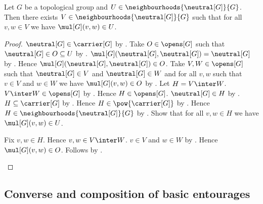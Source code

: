 \begin{theorem}\label{topological_group_identity_neighbourhood_product_refinement}
    Let $G$ be a topological group and
        $U\in\neighbourhoods{\neutral[G]}{G}$.
    Then there exists $V\in\neighbourhoods{\neutral[G]}{G}$ such that
        for all $v,w\in V$ we have $\mul[G](v,w)\in U$.
\end{theorem}
\begin{proof}
    $\neutral[G]\in\carrier[G]$ by .
    Take $O\in\opens[G]$ such that
        $\neutral[G]\in O\subseteq U$ by .
    $\mul[G](\neutral[G],\neutral[G])=\neutral[G]$
        by .
    Hence $\mul[G](\neutral[G],\neutral[G])\in O$.
    Take $V,W\in\opens[G]$ such that
        $\neutral[G]\in V$ and $\neutral[G]\in W$ and
        for all $v,w$ such that $v\in V$ and $w\in W$ we have
            $\mul[G](v,w)\in O$
        by .
    Let $H=V\inter W$.
    $V\inter W\in\opens[G]$ by .
    Hence $H\in\opens[G]$.
    $\neutral[G]\in H$ by .
    $H\subseteq\carrier[G]$ by .
    Hence $H\in\pow{\carrier[G]}$ by .
    Hence $H\in\neighbourhoods{\neutral[G]}{G}$
        by .
    Show that for all $v,w\in H$ we have $\mul[G](v,w)\in U$.
    \begin{subproof}
        Fix $v,w\in H$.
        Hence $v,w\in V\inter W$.
        $v\in V$ and $w\in W$ by .
        Hence $\mul[G](v,w)\in O$.
        Follows by .
    \end{subproof}
\end{proof}

\subsection{Converse and composition of basic entourages}

